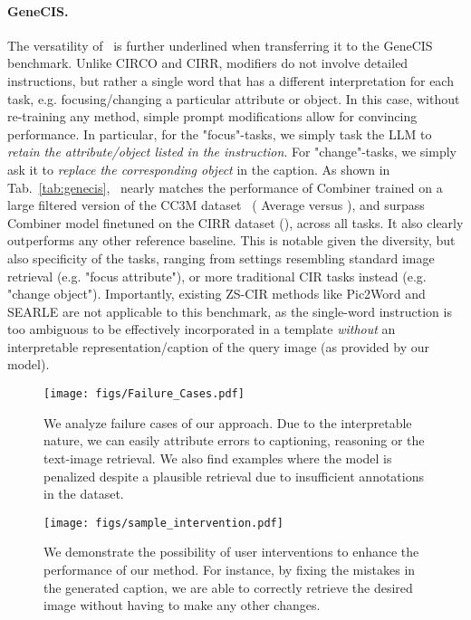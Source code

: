 \documentclass{article} \usepackage{iclr2024_conference,times}
\begin{document}
\paragraph{GeneCIS.} The versatility of \methodNameNS\ is further underlined when transferring it to the GeneCIS benchmark.
Unlike CIRCO and CIRR, modifiers do not involve detailed instructions, but rather a single word that has a different interpretation for each task, e.g. focusing/changing a particular attribute or object. In this case, without re-training any method, simple prompt modifications allow for convincing performance. In particular, for the "focus"-tasks, we simply task the LLM to \textit{retain the attribute/object listed in the instruction}. For "change"-tasks, we simply ask it to \textit{replace the corresponding object} in the caption.
As shown in Tab.~\ref{tab:genecis}, \methodNameNS\ nearly matches the performance of Combiner trained on a large filtered version of the CC3M dataset~\citep{cc3m} ( Average  versus ), and surpass Combiner model finetuned on the CIRR dataset (), across all tasks. It also clearly outperforms any other reference baseline.
This is notable given the diversity, but also specificity of the tasks, ranging from settings resembling standard image retrieval (e.g. "focus attribute"), or more traditional CIR tasks instead (e.g. "change object").
Importantly, existing ZS-CIR methods like Pic2Word and SEARLE are not applicable to this benchmark, as the single-word instruction is too ambiguous to be effectively incorporated in a template \textit{without} an interpretable representation/caption of the query image (as provided by our model). 

\begin{figure}[t]
    \centering
    \texttt{[image: figs/Failure\_Cases.pdf]}
    \caption{We analyze failure cases of our approach. Due to the interpretable nature, we can easily attribute errors to captioning, reasoning or the text-image retrieval. We also find examples where the model is penalized despite a plausible retrieval due to insufficient annotations in the dataset.}
    \label{fig:failure}
\end{figure} \begin{figure}[t]
     \centering
     \texttt{[image: figs/sample\_intervention.pdf]}
     \vspace{-5pt}
\caption{We demonstrate the possibility of user interventions to enhance the performance of our method. For instance, by fixing the mistakes in the generated caption, we are able to correctly retrieve the desired image without having to make any other changes.}
\vspace{-5pt}
\label{fig:intervention}
\end{figure} 
\end{document}
